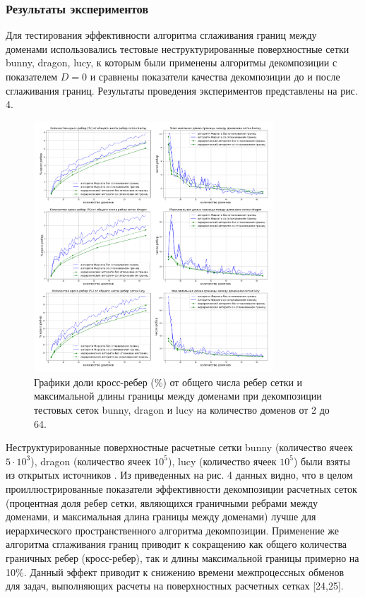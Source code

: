 \subsubsection{Результаты экспериментов}

Для тестирования эффективности алгоритма сглаживания границ между доменами использовались тестовые неструктурированные поверхностные сетки bunny, dragon, lucy, к которым были применены алгоритмы декомпозиции с показателем $D = 0$ и сравнены показатели качества декомпозиции до и после сглаживания границ.
Результаты проведения экспериментов представлены на рис. 4.

\begin{figure}[ht]
	\centering
		\includegraphics[width=0.8\textwidth]{./pics/text_2_smooth/graphics.pdf}
	\caption{Графики доли кросс-ребер (\%) от общего числа ребер сетки и максимальной длины границы между доменами при декомпозиции тестовых сеток bunny, dragon и lucy на количество доменов от 2 до 64.}
	\label{fig:text_2_smooth_graphics}
\end{figure}

Неструктурированные поверхностные расчетные сетки bunny (количество ячеек $5 \cdot 10^3$), dragon (количество ячеек $10^5$), lucy (количество ячеек $10^5$) были взяты из открытых источников .
Из приведенных на рис. 4 данных видно, что в целом проиллюстрированные показатели эффективности декомпозиции расчетных сеток (процентная доля ребер сетки, являющихся граничными ребрами между доменами, и максимальная длина границы между доменами) лучше для иерархического пространственного алгоритма декомпозиции.
Применение же алгоритма сглаживания границ приводит к сокращению как общего количества граничных ребер (кросс-ребер), так и длины максимальной границы примерно на 10\%.
Данный эффект приводит к снижению времени межпроцессных обменов для задач, выполняющих расчеты на поверхностных расчетных сетках [24,25].

